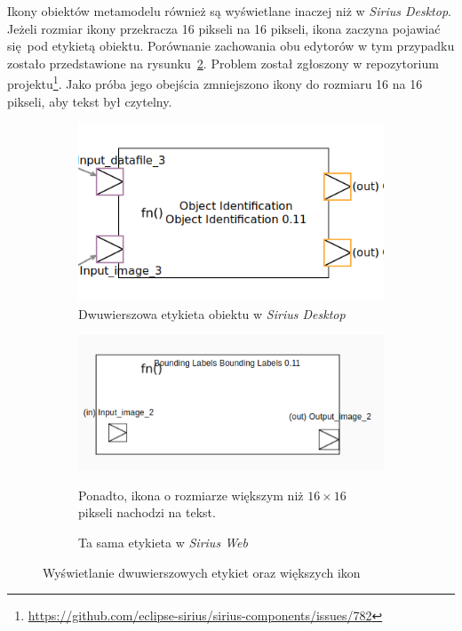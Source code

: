 Ikony obiektów metamodelu również są wyświetlane inaczej niż w \emph{Sirius
	Desktop}. Jeżeli rozmiar ikony przekracza 16 pikseli na 16 pikseli,
ikona
zaczyna pojawiać się pod etykietą obiektu. Porównanie zachowania obu edytorów w
tym przypadku zostało przedstawione na
rysunku~\ref{rys:sirius-multiline-labels}. Problem został zgłoszony w
repozytorium projektu\footnote{
	\url{https://github.com/eclipse-sirius/sirius-components/issues/782}
}. Jako próba jego obejścia zmniejszono ikony do rozmiaru 16 na 16 pikseli, aby
tekst był czytelny.

\begin{figure}
	\centering
	\begin{subfigure}{.49\textwidth}
		\centering
    \includegraphics[width=.99\linewidth]{./images/sirius-desktop-multiline-label.png}
		\caption{Dwuwierszowa etykieta obiektu w \emph{Sirius Desktop}}
	\end{subfigure}
	\begin{subfigure}{.49\textwidth}
		\centering
		\includegraphics[width=.99\linewidth]{./images/sirius-web-multiline-label.png}
		\caption{Ta sama etykieta w \emph{Sirius Web}}\label{rys:border-node-sirius-web}
    \medskip
    {\footnotesize Ponadto, ikona o rozmiarze większym niż $16\times16$ pikseli nachodzi na tekst.}
	\end{subfigure}

    \caption{Wyświetlanie dwuwierszowych
      etykiet oraz większych ikon}\label{rys:sirius-multiline-labels}
\end{figure}

